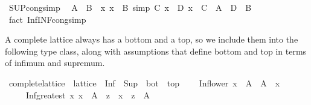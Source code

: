\begin{isabellebody}
\endisatagproof
{\isafoldproof}%
%
\isadelimproof
\isanewline
%
\endisadelimproof
\isanewline
{}\isamarkupfalse%
\ SUP{\isacharunderscore}{\kern0pt}cong{\isacharunderscore}{\kern0pt}simp{\isacharcolon}{\kern0pt}\isanewline
\ \ {\isachardoublequoteopen}A\ {\isacharequal}{\kern0pt}\ B\ {\isasymLongrightarrow}\ {\isacharparenleft}{\kern0pt}{\isasymAnd}x{\isachardot}{\kern0pt}\ x\ {\isasymin}\ B\ {\isacharequal}{\kern0pt}simp{\isacharequal}{\kern0pt}{\isachargreater}{\kern0pt}\ C\ x\ {\isacharequal}{\kern0pt}\ D\ x{\isacharparenright}{\kern0pt}\ {\isasymLongrightarrow}\ {\isasymSqunion}{\isacharparenleft}{\kern0pt}C\ {\isacharbackquote}{\kern0pt}\ A{\isacharparenright}{\kern0pt}\ {\isacharequal}{\kern0pt}\ {\isasymSqunion}{\isacharparenleft}{\kern0pt}D\ {\isacharbackquote}{\kern0pt}\ B{\isacharparenright}{\kern0pt}{\isachardoublequoteclose}\isanewline
%
\isadelimproof
%
\endisadelimproof
%
\isatagproof
{}\isamarkupfalse%
\ {\isacharparenleft}{\kern0pt}fact\ Inf{\isachardot}{\kern0pt}INF{\isacharunderscore}{\kern0pt}cong{\isacharunderscore}{\kern0pt}simp{\isacharparenright}{\kern0pt}%
\endisatagproof
{\isafoldproof}%
%
\isadelimproof
\isanewline
%
\endisadelimproof
\isanewline
{}\isamarkupfalse%
%
\isadelimdocument
%
\endisadelimdocument
%
\isatagdocument
%
\isamarkuptrue%
%
\endisatagdocument
{\isafolddocument}%
%
\isadelimdocument
%
\endisadelimdocument
%
\begin{isamarkuptext}%
A complete lattice always has a bottom and a top,
so we include them into the following type class,
along with assumptions that define bottom and top
in terms of infimum and supremum.%
\end{isamarkuptext}\isamarkuptrue%
\isamarkupfalse%
\ complete{\isacharunderscore}{\kern0pt}lattice\ {\isacharequal}{\kern0pt}\ lattice\ {\isacharplus}{\kern0pt}\ Inf\ {\isacharplus}{\kern0pt}\ Sup\ {\isacharplus}{\kern0pt}\ bot\ {\isacharplus}{\kern0pt}\ top\ {\isacharplus}{\kern0pt}\isanewline
\ \ \ Inf{\isacharunderscore}{\kern0pt}lower{\isacharcolon}{\kern0pt}\ {\isachardoublequoteopen}x\ {\isasymin}\ A\ {\isasymLongrightarrow}\ {\isasymSqinter}A\ {\isasymle}\ x{\isachardoublequoteclose}\isanewline
\ \ \ \ \ Inf{\isacharunderscore}{\kern0pt}greatest{\isacharcolon}{\kern0pt}\ {\isachardoublequoteopen}{\isacharparenleft}{\kern0pt}{\isasymAnd}x{\isachardot}{\kern0pt}\ x\ {\isasymin}\ A\ {\isasymLongrightarrow}\ z\ {\isasymle}\ x{\isacharparenright}{\kern0pt}\ {\isasymLongrightarrow}\ z\ {\isasymle}\ {\isasymSqinter}A{\isachardoublequoteclose}\isanewline

\end{isabellebody}
